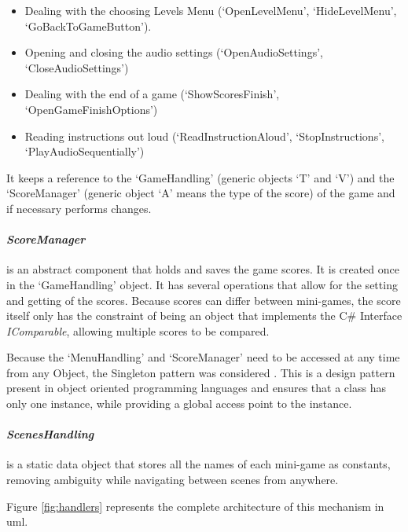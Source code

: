 \begin{itemize}
    \item Dealing with the choosing Levels Menu (`OpenLevelMenu', `HideLevelMenu', `GoBackToGameButton').
    \item Opening and closing the audio settings (`OpenAudioSettings', `CloseAudioSettings')
    \item Dealing with the end of a game (`ShowScoresFinish', `OpenGameFinishOptions')
    \item Reading instructions out loud (`ReadInstructionAloud', `StopInstructions', `PlayAudioSequentially')
\end{itemize}

It keeps a reference to the `GameHandling' (generic objects `T' and `V') and the `ScoreManager' (generic object `A' means the type of the score) of the game and if necessary performs changes.\\

\paragraph{\textit{ScoreManager}} is an abstract component that holds and saves the game scores. It is created once in the `GameHandling' object. It has several operations that allow for the setting and getting of the scores. Because scores can differ between mini-games, the score itself only has the constraint of being an object that implements the C\# Interface \textit{IComparable}, allowing multiple scores to be compared.

Because the `MenuHandling' and `ScoreManager' need to be accessed at any time from any Object, the Singleton pattern was considered \cite{singleton}. This is a design pattern present in object oriented programming languages and ensures that a class has only one instance, while providing a global access point to the instance.

\paragraph{\textit{ScenesHandling}} is a static data object that stores all the names of each mini-game as constants, removing ambiguity while navigating between scenes from anywhere.

Figure \ref{fig:handlers} represents the complete architecture of this mechanism in \gls{uml}.

